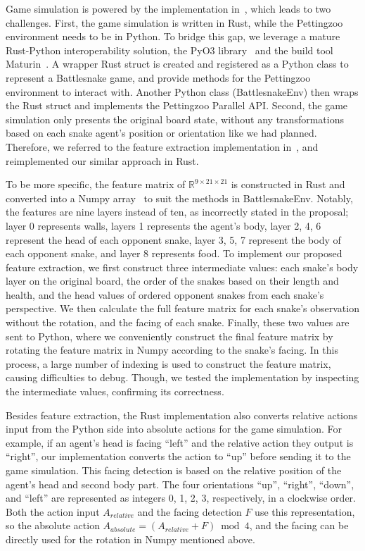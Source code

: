 \documentclass[a4paper]{article}
\begin{document}
Game simulation is powered by the implementation in~\cite{wrenger2024rusty},
which leads to two challenges. First, the game simulation is written in Rust,
while the Pettingzoo environment needs to be in Python. To bridge this gap,
we leverage a mature Rust-Python interoperability solution,
the PyO3 library~\cite{pyo3} and the build tool Maturin~\cite{maturin}.
A wrapper Rust struct is created and registered as a Python class to represent a
Battlesnake game,
and provide methods for the Pettingzoo environment to interact with.
Another Python class (\textsf{BattlesnakeEnv})
then wraps the Rust struct and implements the Pettingzoo Parallel API. Second,
the game simulation only presents the original board state,
without any transformations based on each snake agent's position or orientation
like we had planned. Therefore,
we referred to the feature extraction implementation
in~\cite{siddiqui2020multiagent},
and reimplemented our similar approach in Rust.

To be more specific,
the feature matrix of $\mathbb R^{9\times21\times21}$ is constructed in Rust and
converted into a Numpy array~\cite{harris2020array}
to suit the methods in \textsf{BattlesnakeEnv}. Notably,
the features are nine layers instead of ten,
as incorrectly stated in the proposal; layer 0 represents walls,
layers 1 represents the agent's body, layer 2, 4,
6 represent the head of each opponent snake, layer 3, 5,
7 represent the body of each opponent snake, and layer 8 represents food.
To implement our proposed feature extraction,
we first construct three intermediate values:
each snake's body layer on the original board,
the order of the snakes based on their length and health,
and the head values of ordered opponent snakes from each snake's perspective.
We then calculate the full feature matrix for each snake's observation without
the rotation, and the facing of each snake. Finally,
these two values are sent to Python,
where we conveniently construct the final feature matrix by rotating the feature
matrix in Numpy according to the snake's facing. In this process,
a large number of indexing is used to construct the feature matrix,
causing difficulties to debug. Though,
we tested the implementation by inspecting the intermediate values,
confirming its correctness.

Besides feature extraction,
the Rust implementation also converts relative actions input from the Python
side into absolute actions for the game simulation. For example,
if an agent's head is facing ``left'' and the relative action they output is
``right'',
our implementation converts the action to ``up'' before sending it to the game
simulation.
This facing detection is based on the relative position of the agent's head and
second body part. The four orientations ``up'', ``right'', ``down'',
and ``left'' are represented as integers 0, 1, 2, 3, respectively,
in a clockwise order.
Both the action input $A_{relative}$ and the facing detection $F$ use this
representation, so the absolute action $A_{absolute}=(A_{relative}+F)\bmod 4$,
and the facing can be directly used for the rotation in Numpy mentioned above.
\end{document}
